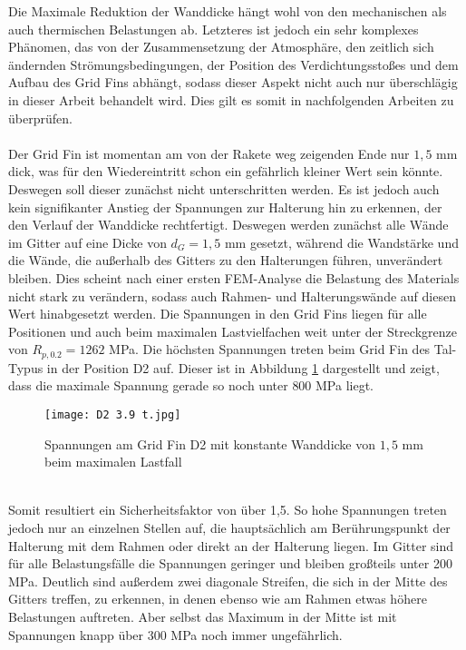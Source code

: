 Die Maximale Reduktion der Wanddicke hängt wohl von den mechanischen als auch thermischen Belastungen ab. Letzteres ist jedoch ein sehr komplexes Phänomen, das von der Zusammensetzung der Atmosphäre, den zeitlich sich ändernden Strömungsbedingungen, der Position des Verdichtungsstoßes und dem Aufbau des Grid Fins abhängt, sodass dieser Aspekt nicht auch nur überschlägig in dieser Arbeit behandelt wird. Dies gilt es somit in nachfolgenden Arbeiten zu überprüfen.
\\~\\
Der Grid Fin ist momentan am von der Rakete weg zeigenden Ende nur $1,5$ mm dick, was für den Wiedereintritt schon ein gefährlich kleiner Wert sein könnte. Deswegen soll dieser zunächst nicht unterschritten werden. Es ist jedoch auch kein signifikanter Anstieg der Spannungen zur Halterung hin zu erkennen, der den Verlauf der Wanddicke rechtfertigt. Deswegen werden zunächst alle Wände im Gitter auf eine Dicke von $d_G = 1,5$ mm gesetzt, während die Wandstärke und die Wände, die außerhalb des Gitters zu den Halterungen führen, unverändert bleiben. Dies scheint nach einer ersten FEM-Analyse die Belastung des Materials nicht stark zu verändern, sodass auch Rahmen- und Halterungswände auf diesen Wert hinabgesetzt werden. Die Spannungen in den Grid Fins liegen für alle Positionen und auch beim maximalen Lastvielfachen weit unter der Streckgrenze von $R_{p, 0.2} = 1262$ MPa. Die höchsten Spannungen treten beim Grid Fin des Tal-Typus in der Position D2 auf. Dieser ist in Abbildung \ref{abb_V100} dargestellt und zeigt, dass die maximale Spannung gerade so noch unter $800$ MPa liegt.
\begin{figure}[h] 
	\centering
	\texttt{[image: D2 3.9 t.jpg]}
	\caption{Spannungen am Grid Fin D2 mit konstante Wanddicke von $1,5$ mm beim maximalen Lastfall}
	\label{abb_V100}
\end{figure}\\
Somit resultiert ein Sicherheitsfaktor von über 1,5. So hohe Spannungen treten jedoch nur an einzelnen Stellen auf, die hauptsächlich am Berührungspunkt der Halterung mit dem Rahmen oder direkt an der Halterung liegen. Im Gitter sind für alle Belastungsfälle die Spannungen geringer und bleiben großteils unter 200 MPa. Deutlich sind außerdem zwei diagonale Streifen, die sich in der Mitte des Gitters treffen, zu erkennen, in denen ebenso wie am Rahmen etwas höhere Belastungen auftreten. Aber selbst das Maximum in der Mitte ist mit Spannungen knapp über 300 MPa noch immer ungefährlich.
\\~\\
